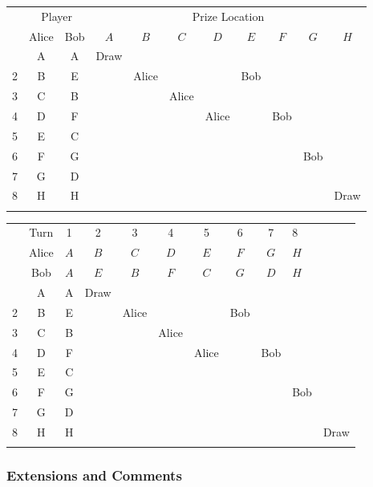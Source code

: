 \begin{table}[H]
	\centering
	\begin{tabular}{ccccccccccc}
		\myhline
		\multirow{2}{*}{Turn} & \multicolumn{2}{c}{Player} & \multicolumn{8}{c}{Prize Location}  \\
		 & Alice & Bob & $A$ & $B$ & $C$ & $D$ & $E$ & $F$ & $G$ & $H$  \\
		 \myhline
		 1 & A & A & Draw  &       &       &       &       &       &       &        \\
		 2 & B & E &       & Alice &       &       & Bob   &       &       &        \\
		 3 & C & B &       &       & Alice &       &       &       &       &        \\
		 4 & D & F &       &       &       & Alice &       & Bob   &       &        \\
		 5 & E & C &       &       &       &       &       &       &       &        \\
		 6 & F & G &       &       &       &       &       &       & Bob   &        \\
		 7 & G & D &       &       &       &       &       &       &       &        \\
		 8 & H & H &       &       &       &       &       &       &       & Draw   \\
		 \myhline
	\end{tabular}
\end{table}

\begin{table}[H]
	\centering
	\begin{tabular}{ccccccccc}
		\myhline
		& Turn  & 1   & 2   & 3   & 4   & 5   & 6   & 7   & 8    \\
		& Alice & $A$ & $B$ & $C$ & $D$ & $E$ & $F$ & $G$ & $H$  \\
		& Bob   & $A$ & $E$ & $B$ & $F$ & $C$ & $G$ & $D$ & $H$  \\
		 & A & A & Draw  &       &       &       &       &       &       &        \\
		2 & B & E &       & Alice &       &       & Bob   &       &       &        \\
		3 & C & B &       &       & Alice &       &       &       &       &        \\
		4 & D & F &       &       &       & Alice &       & Bob   &       &        \\
		5 & E & C &       &       &       &       &       &       &       &        \\
		6 & F & G &       &       &       &       &       &       & Bob   &        \\
		7 & G & D &       &       &       &       &       &       &       &        \\
		8 & H & H &       &       &       &       &       &       &       & Draw   \\
		\myhline
	\end{tabular}
\end{table}

\subsubsection{Extensions and Comments}

